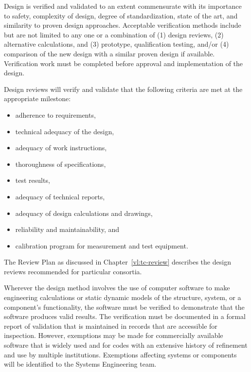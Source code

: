 Design is verified and validated to an extent commensurate with its
importance to safety, complexity of design, degree of standardization,
state of the art, and similarity to proven design
approaches. Acceptable verification methods include but are not
limited to any one or a combination of (1) design reviews, (2)
alternative calculations, and (3) prototype, qualification testing,
and/or (4) comparison of the new design with a similar proven design
if available. Verification work must be completed before approval and
implementation of the design.

Design reviews will verify and validate that the following criteria
are met at the appropriate milestone:
\begin{itemize}
 \item adherence to requirements,
 \item technical adequacy of the design,
 \item adequacy of work instructions,
 \item thoroughness of specifications,
 \item test results,
 \item adequacy of technical reports,
 \item adequacy of design calculations and drawings,
 \item reliability and maintainability, and
 \item calibration program for measurement and test equipment.
\end{itemize}
The  Review Plan as discussed in
Chapter~\ref{vl:tc-review} describes the design reviews recommended
for %
particular consortia.

Wherever the design method involves the use of
computer software to make engineering calculations or static dynamic
models of the structure, system, or a component's functionality, the
software must be verified to demonstrate that the software produces
valid results. The verification must be documented in a formal
report of validation that is maintained in records that are accessible
for inspection. However, exemptions may be made for commercially
available software that is widely used and for codes with an extensive
history of refinement and use by multiple institutions. Exemptions
affecting systems or components will be identified to the
 Systems Engineering team.

